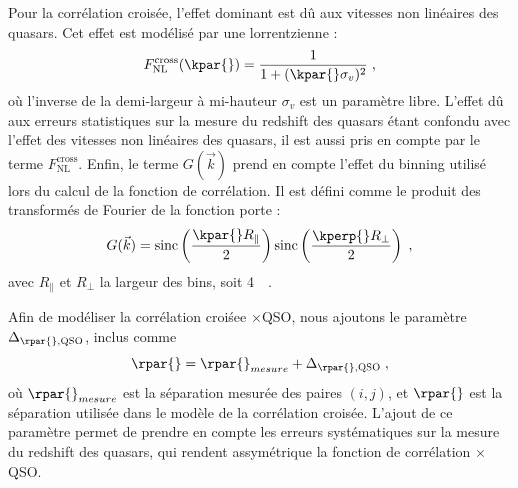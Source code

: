 Pour la corrélation croisée, l'effet dominant est dû aux vitesses non linéaires des quasars. Cet effet est modélisé par une lorrentzienne :
\begin{equation}
  F_{\mathrm{NL}}^{\mathrm{cross}}(\kpar{}) = \frac{1}{1 + (\kpar{} \sigma_v)^2} \; ,
\end{equation}
où l'inverse de la demi-largeur à mi-hauteur $\sigma_v$ est un paramètre libre. L'effet dû aux erreurs statistiques sur la mesure du redshift des quasars étant confondu avec l'effet des vitesses non linéaires des quasars, il est aussi pris en compte par le terme $  F_{\mathrm{NL}}^{\mathrm{cross}}$.
Enfin, le terme $G(\vec k)$ prend en compte l'effet du binning utilisé lors du calcul de la fonction de corrélation.
Il est défini comme le produit des transformés de Fourier de la fonction porte :
\begin{equation}
  G(\vec k) = \mathrm{sinc}\left(\frac{\kpar{}R_{\parallel}}{2}\right)\mathrm{sinc}\left(\frac{\kperp{}R_{\perp}}{2}\right) \; ,
\end{equation}
avec $R_{\parallel}$ et $R_{\perp}$ la largeur des bins, soit \SI{4}{\perh\Mpc}.

Afin de modéliser la corrélation croiśee \lya{}$\times$QSO, nous ajoutons le paramètre $\Delta_{\rpar{}, \textsc{QSO}}$, inclus comme
\begin{equation}
  \rpar{} = \rpar{}_{mesure} + \Delta_{\rpar{}, \textsc{QSO}} \; ,
\end{equation}
où $\rpar{}_{mesure}$ est la séparation mesurée des paires $(i,j)$, et $\rpar{}$ est la séparation utilisée dans le modèle de la corrélation croisée. L'ajout de ce paramètre permet de prendre en compte les erreurs systématiques sur la mesure du redshift des quasars, qui rendent assymétrique la fonction de corrélation \lya{}$\times$QSO.

